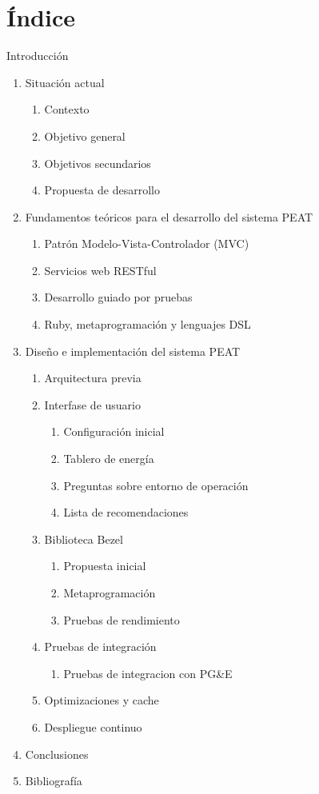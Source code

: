 \documentclass{article}
\begin{document}
\section{Índice}
Introducción
\begin{enumerate}
\item Situación actual
  \begin{enumerate}[label*=\arabic*.]
  \item{Contexto}
  \item{Objetivo general}
  \item{Objetivos secundarios}
  \item{Propuesta de desarrollo}
  \end{enumerate}
\item Fundamentos teóricos para el desarrollo del sistema PEAT
  \begin{enumerate}[label*=\arabic*.]
  \item{Patrón Modelo-Vista-Controlador (MVC)}
  \item{Servicios web RESTful}
  \item{Desarrollo guiado por pruebas}
  \item{Ruby, metaprogramación y lenguajes DSL}
  \end{enumerate}
\item Diseño e implementación del sistema PEAT
  \begin{enumerate}[label*=\arabic*.]
  \item Arquitectura previa
  \item Interfase de usuario
    \begin{enumerate}[label*=\arabic*.]
    \item Configuración inicial
    \item Tablero de energía
    \item Preguntas sobre entorno de operación
    \item Lista de recomendaciones
    \end{enumerate}
  \item Biblioteca Bezel
    \begin{enumerate}[label*=\arabic*.]
    \item Propuesta inicial
    \item Metaprogramación
    \item Pruebas de rendimiento
    \end{enumerate}
  \item Pruebas de integración
    \begin{enumerate}[label*=\arabic*.]
    \item Pruebas de integracion con PG\&E
    \end{enumerate}
  \item Optimizaciones y cache
  \item Despliegue continuo
  \end{enumerate}
\item Conclusiones
\item Bibliografía
\end{enumerate}
\end{document}
